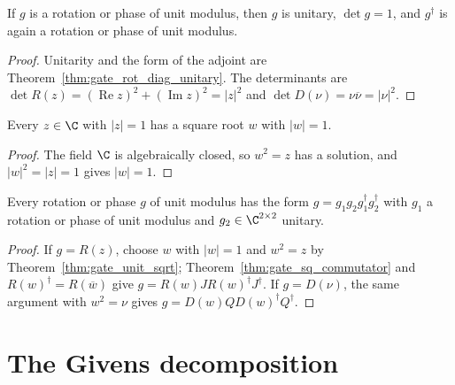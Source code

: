 \begin{theorem}
    \label{thm:gate_special_two}
    \leanok
    If $g$ is a rotation or phase of unit modulus, then $g$ is unitary,
    $\det g=1$, and $g^\dagger$ is again a rotation or phase of unit modulus.
\end{theorem}
\begin{proof}\leanok
    Unitarity and the form of the adjoint are
    Theorem~\ref{thm:gate_rot_diag_unitary}. The determinants are
    $\det R(z)=(\operatorname{Re}z)^2+(\operatorname{Im}z)^2=|z|^2$ and
    $\det D(\nu)=\nu\overline\nu=|\nu|^2$.
\end{proof}

\begin{theorem}
    \label{thm:gate_unit_sqrt}
    \leanok
    Every $z\in\C$ with $|z|=1$ has a square root $w$ with $|w|=1$.
\end{theorem}
\begin{proof}\leanok
    The field $\C$ is algebraically closed, so $w^2=z$ has a solution, and
    $|w|^2=|z|=1$ gives $|w|=1$.
\end{proof}

\begin{theorem}
    \label{thm:gate_special_two_commutator}
    \leanok
    Every rotation or phase $g$ of unit modulus has the form
    $g=g_1g_2g_1^\dagger g_2^\dagger$ with $g_1$ a rotation or phase of unit
    modulus and $g_2\in\C^{2\times2}$ unitary.
\end{theorem}
\begin{proof}\leanok
    If $g=R(z)$, choose $w$ with $|w|=1$ and $w^2=z$ by
    Theorem~\ref{thm:gate_unit_sqrt}; Theorem~\ref{thm:gate_sq_commutator}
    and $R(w)^\dagger=R(\overline w)$ give $g=R(w)JR(w)^\dagger J^\dagger$.
    If $g=D(\nu)$, the same argument with $w^2=\nu$ gives
    $g=D(w)QD(w)^\dagger Q^\dagger$.
\end{proof}

\section{The Givens decomposition}
\label{sec:gate_givens}

